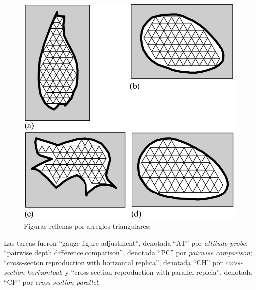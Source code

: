 \documentclass[a4paper,12pt]{article}
\begin{document}
\begin{figure}[ht]
	\begin{center}
		\includegraphics[scale=0.3]{Koenderick2001(2).png}
		\caption{Figuras rellenas por arreglos triangulares.}
	\end{center}
\end{figure}

Las tareas fueron ``gauge-figure adjustment'', denotada ``AT'' por {\itshape attitude probe}; ``pairwise depth difference comparison'', denotada ``PC'' por {\itshape pairwise comparison}; ``cross-secton reproduction with horizontal replica'', denotada ``CH'' por {\itshape corss-section horizontoal}; y ``cross-section reproduction with parallel replcia'', denotada ``CP'' por {\itshape cross-section parallel}. 
\end{document}
